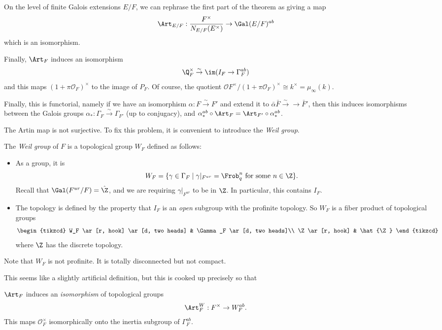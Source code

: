 \documentclass[a4paper]{article}
\begin{document}
On the level of finite Galois extensions $E/F$, we can rephrase the first part of the theorem as giving a map
\[
  \Art_{E/F}: \frac{F^\times}{N_{E/F}(E^\times)} \to \Gal(E/F)^{ab}
\]
which is an isomorphism.

Finally, $\Art_F$ induces an isomorphism
\[
  \Q_F^\times \overset{\sim}{\to} \im(I_F \to \Gamma_F^{ab})
\]
and this maps $(1 + \pi \mathcal{O}_F)^\times$ to the image of $P_F$. Of course, the quotient $\mathcal{O}F^\times/(1 + \pi \mathcal{O}_F)^\times \cong k^\times = \mu_\infty(k)$.

Finally, this is functorial, namely if we have an isomorphism $\alpha: F \overset{\sim}{\to} F'$ and extend it to $\bar{\alpha} \bar{F} \overset{\sim}{\to} \to \bar{F}'$, then this induces isomorphisms between the Galois groups $\alpha_*: \Gamma_F \overset{\sim}{\to} \Gamma_{F'}$ (up to conjugacy), and $\alpha_*^{ab} \circ \Art_F = \Art_{F'} \circ \alpha_*^{ab}$.

The Artin map is not surjective. To fix this problem, it is convenient to introduce the \emph{Weil group}.
\begin{defi}
  The \emph{Weil group} of $F$ is a topological group $W_F$ defined as follows:
  \begin{itemize}
    \item As a group, it is
      \[
        W_F = \{\gamma \in \Gamma_F \mid \gamma|_{F^{ur}} = \Frob_q^n\text{ for some }n \in \Z\}.
      \]
      Recall that $\Gal(F^{ur}/F) = \hat{\Z}$, and we are requiring $\gamma|_{F^{ur}}$ to be in $\Z$. In particular, this contains $I_F$.
    \item The topology is defined by the property that $I_F$ is an \emph{open} subgroup with the profinite topology. So $W_F$ is a fiber product of topological groups
      \[
        \begin{tikzcd}
          W_F \ar[r, hook] \ar[d, two heads] & \Gamma_F \ar[d, two heads]\\
          \Z \ar[r, hook] & \hat{\Z}
        \end{tikzcd}
      \]
      where $\Z$ has the discrete topology.
  \end{itemize}
\end{defi}
Note that $W_F$ is not profinite. It is totally disconnected but not compact.

This seems like a slightly artificial definition, but this is cooked up precisely so that
\begin{prop}
  $\Art_F$ induces an \emph{isomorphism} of topological groups
  \[
    \Art_F^W: F^\times \to W_F^{ab}.
  \]
  This maps $\mathcal{O}_F^\times$ isomorphically onto the inertia subgroup of $\Gamma_F^{ab}$.
\end{prop}
\end{document}
